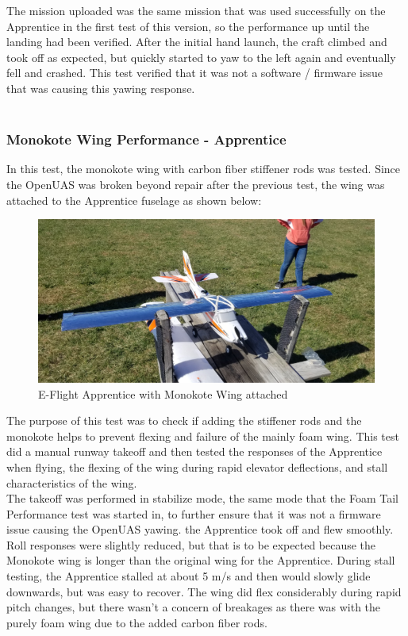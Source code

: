 \documentclass{article}
\begin{document}
The mission uploaded was the same mission that was used successfully on the Apprentice in the first test of this version, so the performance up until the landing had been verified. After the initial hand launch, the craft climbed and took off as expected, but quickly started to yaw to the left again and eventually fell and crashed. This test verified that it was not a software / firmware issue that was causing this yawing response. \\ \\

\subsubsection*{Monokote Wing Performance - Apprentice}
In this test, the monokote wing with carbon fiber stiffener rods was tested. Since the OpenUAS was broken beyond repair after the previous test, the wing was attached to the Apprentice fuselage as shown below:
\begin{figure}[H]
\includegraphics[width = \columnwidth]{Apprentice_MonokoteWing.jpg}
\caption{E-Flight Apprentice with Monokote Wing attached}
\end{figure}
The purpose of this test was to check if adding the stiffener rods and the monokote helps to prevent flexing and failure of the mainly foam wing. This test did a manual runway takeoff and then tested the responses of the Apprentice when flying, the flexing of the wing during rapid elevator deflections, and stall characteristics of the wing. \\
The takeoff was performed in stabilize mode, the same mode that the Foam Tail Performance test was started in, to further ensure that it was not a firmware issue causing the OpenUAS yawing. the Apprentice took off and flew smoothly. Roll responses were slightly reduced, but that is to be expected because the Monokote wing is longer than the original wing for the Apprentice. During stall testing, the Apprentice stalled at about 5 m/s and then would slowly glide downwards, but was easy to recover. The wing did flex considerably during rapid pitch changes, but there wasn't a concern of breakages as there was with the purely foam wing due to the added carbon fiber rods. \\
\end{document}

